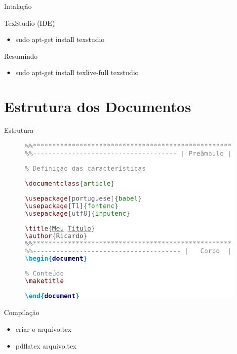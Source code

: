 \documentclass{beamer}
\begin{document}
\begin{frame}{Intalação}

	\begin{block}{TexStudio (IDE)}
		\begin{itemize}
			\item sudo apt-get install texstudio
		\end{itemize}
	\end{block}
	
	

	\begin{block}{Resumindo}
		\begin{itemize}
			\item sudo apt-get install texlive-full texstudio 
		\end{itemize}
	\end{block}

\end{frame}


\section{Estrutura dos Documentos}

\begin{frame}{Estrutura}

	\begin{figure}[!htb]
		\centering
		\includegraphics[scale=.4]{estrutura.png}
	\end{figure}

\end{frame}


\begin{frame}{Compilação}
	
	\begin{itemize}
		\item criar o arquivo.tex
		\item pdflatex arquivo.tex
	\end{itemize}

\end{frame}
\end{document}
